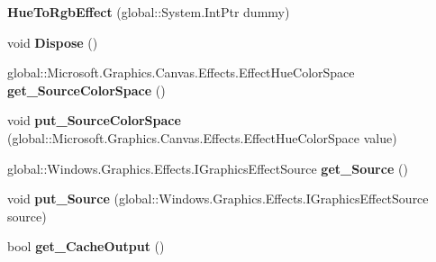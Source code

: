 \begin{DoxyCompactItemize}
{\bfseries Hue\+To\+Rgb\+Effect} (global\+::\+System.\+Int\+Ptr dummy)
\item 
\mbox{\label{class_microsoft_1_1_graphics_1_1_canvas_1_1_effects_1_1_hue_to_rgb_effect_a1de87a5854a8b08664e699bdce44d1fc}} 
void {\bfseries Dispose} ()
\item 
\mbox{\label{class_microsoft_1_1_graphics_1_1_canvas_1_1_effects_1_1_hue_to_rgb_effect_a4cad75cc3cb61500073d87abf6b91d73}} 
global\+::\+Microsoft.\+Graphics.\+Canvas.\+Effects.\+Effect\+Hue\+Color\+Space {\bfseries get\+\_\+\+Source\+Color\+Space} ()
\item 
\mbox{\label{class_microsoft_1_1_graphics_1_1_canvas_1_1_effects_1_1_hue_to_rgb_effect_a1ec9f6e57b1e6f130048b5332435b209}} 
void {\bfseries put\+\_\+\+Source\+Color\+Space} (global\+::\+Microsoft.\+Graphics.\+Canvas.\+Effects.\+Effect\+Hue\+Color\+Space value)
\item 
\mbox{\label{class_microsoft_1_1_graphics_1_1_canvas_1_1_effects_1_1_hue_to_rgb_effect_a2a74d1b335531e7c117926f1b1f892db}} 
global\+::\+Windows.\+Graphics.\+Effects.\+I\+Graphics\+Effect\+Source {\bfseries get\+\_\+\+Source} ()
\item 
\mbox{\label{class_microsoft_1_1_graphics_1_1_canvas_1_1_effects_1_1_hue_to_rgb_effect_aef045e9ba0ae3122d52fbf1bf96c7fd4}} 
void {\bfseries put\+\_\+\+Source} (global\+::\+Windows.\+Graphics.\+Effects.\+I\+Graphics\+Effect\+Source source)
\item 
\mbox{\label{class_microsoft_1_1_graphics_1_1_canvas_1_1_effects_1_1_hue_to_rgb_effect_ad3d502f76147d1bdc5e19c9aaa8188f1}} 
bool {\bfseries get\+\_\+\+Cache\+Output} ()
\item 
\mbox{\label{class_microsoft_1_1_graphics_1_1_canvas_1_1_effects_1_1_hue_to_rgb_effect_a63b0e088c221b61a3c62ef8294201e62}} 

\end{DoxyCompactItemize}
